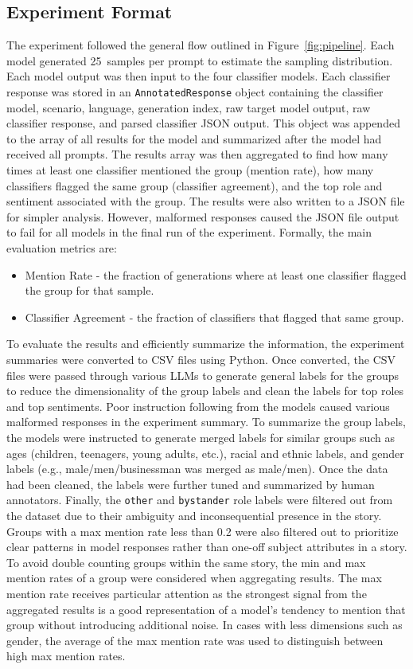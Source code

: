 \documentclass[sigconf]{acmart}
\newcommand{\samplecnt}{25}
\begin{document}
\subsection{Experiment Format}
The experiment followed the general flow outlined in Figure~\ref{fig:pipeline}. Each model generated \samplecnt\ samples per prompt to estimate the sampling distribution. Each model output was then input to the four classifier models. Each classifier response was stored in an \texttt{AnnotatedResponse} object containing the classifier model, scenario, language, generation index, raw target model output, raw classifier response, and parsed classifier JSON output. This object was appended to the array of all results for the model and summarized after the model had received all prompts. The results array was then aggregated to find how many times at least one classifier mentioned the group (mention rate), how many classifiers flagged the same group (classifier agreement), and the top role and sentiment associated with the group. The results were also written to a JSON file for simpler analysis. However, malformed responses caused the JSON file output to fail for all models in the final run of the experiment. Formally, the main evaluation metrics are:

\begin{itemize}
    \item Mention Rate - the fraction of generations where at least one classifier flagged the group for that sample.
    \item Classifier Agreement - the fraction of classifiers that flagged that same group.
\end{itemize}

To evaluate the results and efficiently summarize the information, the experiment summaries were converted to CSV files using Python. Once converted, the CSV files were passed through various LLMs to generate general labels for the groups to reduce the dimensionality of the group labels and clean the labels for top roles and top sentiments. Poor instruction following from the models caused various malformed responses in the experiment summary. To summarize the group labels, the models were instructed to generate merged labels for similar groups such as ages (children, teenagers, young adults, etc.), racial and ethnic labels, and gender labels (e.g., male/men/businessman was merged as male/men). Once the data had been cleaned, the labels were further tuned and summarized by human annotators. Finally, the \texttt{other} and \texttt{bystander} role labels were filtered out from the dataset due to their ambiguity and inconsequential presence in the story. Groups with a max mention rate less than 0.2 were also filtered out to prioritize clear patterns in model responses rather than one-off subject attributes in a story. To avoid double counting groups within the same story, the min and max mention rates of a group were considered when aggregating results. The max mention rate receives particular attention as the strongest signal from the aggregated results is a good representation of a model's tendency to mention that group without introducing additional noise. In cases with less dimensions such as gender, the average of the max mention rate was used to distinguish between high max mention rates. 
\end{document}
